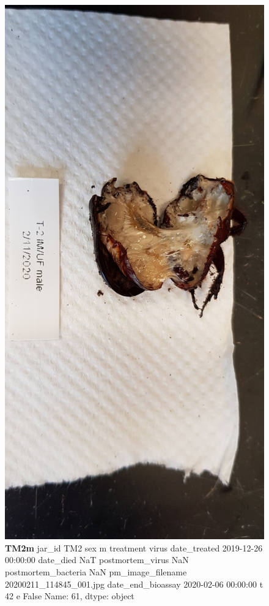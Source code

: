 \begin{figure}[h!]
\centering
\includegraphics[width=\textwidth]{pm-images/20200211_114845_001.jpg}
\caption{\textbf{TM2m} jar\_id                                     TM2
sex                                          m
treatment                                virus
date\_treated               2019-12-26 00:00:00
date\_died                                  NaT
postmortem\_virus                           NaN
postmortem\_bacteria                        NaN
pm\_image\_filename      20200211\_114845\_001.jpg
date\_end\_bioassay          2020-02-06 00:00:00
t                                           42
e                                        False
Name: 61, dtype: object}
\end{figure}
\clearpage

